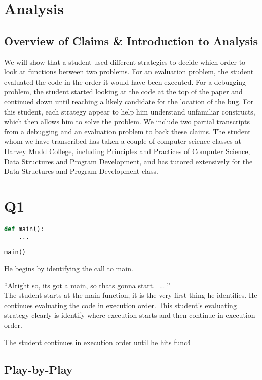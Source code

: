 \section{Analysis}
\subsection{Overview of Claims \& Introduction to Analysis}

We will show that a student used different strategies to decide which order to look at functions between two problems.
For an evaluation problem, the student evaluated the code in the order it would have been executed.
For a debugging problem, the student started looking at the code at the top of the paper and continued down until reaching a likely candidate for the location of the bug.
For this student, each strategy appear to help him understand unfamiliar constructs, which then allows him to solve the problem. 
We include two partial transcripts from a debugging and an evaluation problem to back these claims. 
The student whom we have transcribed has taken a couple of computer science classes at Harvey Mudd College, including Principles and Practices of Computer Science, Data Structures and Program Development, and has tutored extensively for the Data Structures and Program Development class.

\section{Q1}
\begin{lstlisting}[language=python]
def main():
    ...

main()
\end{lstlisting}
He begins by identifying the call to main.

``Alright so, its got a main, so thats gonna start. [...]''\\

The student starts at the main function, it is the very first thing he identifies.
He continues evaluating the code in execution order.
This student's evaluating strategy clearly is identify where execution starts and then continue in execution order.

The student continues in execution order until he hits func4



\subsection{Play-by-Play}

